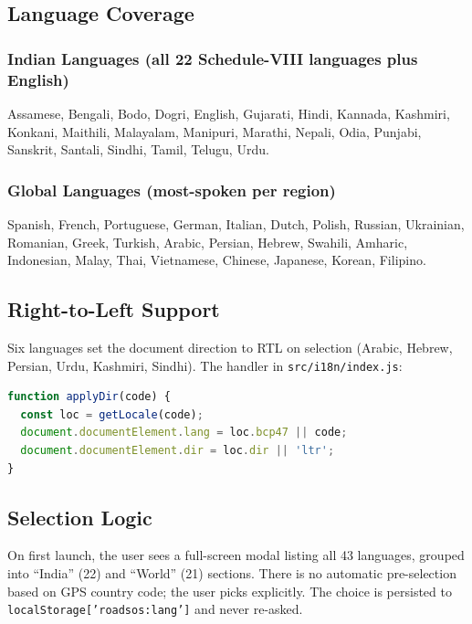 \documentclass[11pt, a4paper]{article}
\newcommand{\file}[1]{\texttt{\small\color{rsblue}#1}}
\newcommand{\code}[1]{\texttt{\small#1}}
\begin{document}
\subsection{Language Coverage}

\subsubsection{Indian Languages (all 22 Schedule-VIII languages plus English)}

Assamese, Bengali, Bodo, Dogri, English, Gujarati, Hindi, Kannada, Kashmiri, Konkani, Maithili, Malayalam, Manipuri, Marathi, Nepali, Odia, Punjabi, Sanskrit, Santali, Sindhi, Tamil, Telugu, Urdu.

\subsubsection{Global Languages (most-spoken per region)}

Spanish, French, Portuguese, German, Italian, Dutch, Polish, Russian, Ukrainian, Romanian, Greek, Turkish, Arabic, Persian, Hebrew, Swahili, Amharic, Indonesian, Malay, Thai, Vietnamese, Chinese, Japanese, Korean, Filipino.

\subsection{Right-to-Left Support}

Six languages set the document direction to RTL on selection (Arabic, Hebrew, Persian, Urdu, Kashmiri, Sindhi). The handler in \file{src/i18n/index.js}:

\begin{lstlisting}[language=JavaScript,caption={i18n/index.js --- applyDir}]
function applyDir(code) {
  const loc = getLocale(code);
  document.documentElement.lang = loc.bcp47 || code;
  document.documentElement.dir = loc.dir || 'ltr';
}
\end{lstlisting}

\subsection{Selection Logic}

On first launch, the user sees a full-screen modal listing all 43 languages, grouped into ``India'' (22) and ``World'' (21) sections. There is no automatic pre-selection based on GPS country code; the user picks explicitly. The choice is persisted to \code{localStorage['roadsos:lang']} and never re-asked.
\end{document}
